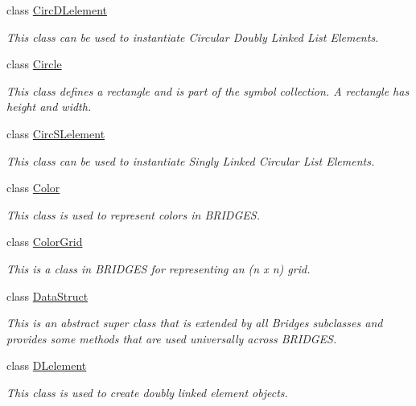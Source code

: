 \begin{DoxyCompactItemize}
class \mbox{\hyperlink{classbridges_1_1base_1_1_circ_d_lelement}{Circ\+D\+Lelement}}
\begin{DoxyCompactList}\small\item\em This class can be used to instantiate Circular Doubly Linked List Elements. \end{DoxyCompactList}\item 
class \mbox{\hyperlink{classbridges_1_1base_1_1_circle}{Circle}}
\begin{DoxyCompactList}\small\item\em This class defines a rectangle and is part of the symbol collection. A rectangle has height and width. \end{DoxyCompactList}\item 
class \mbox{\hyperlink{classbridges_1_1base_1_1_circ_s_lelement}{Circ\+S\+Lelement}}
\begin{DoxyCompactList}\small\item\em This class can be used to instantiate Singly Linked Circular List Elements. \end{DoxyCompactList}\item 
class \mbox{\hyperlink{classbridges_1_1base_1_1_color}{Color}}
\begin{DoxyCompactList}\small\item\em This class is used to represent colors in B\+R\+I\+D\+G\+ES. \end{DoxyCompactList}\item 
class \mbox{\hyperlink{classbridges_1_1base_1_1_color_grid}{Color\+Grid}}
\begin{DoxyCompactList}\small\item\em This is a class in B\+R\+I\+D\+G\+ES for representing an (n x n) grid. \end{DoxyCompactList}\item 
class \mbox{\hyperlink{classbridges_1_1base_1_1_data_struct}{Data\+Struct}}
\begin{DoxyCompactList}\small\item\em This is an abstract super class that is extended by all Bridges subclasses and provides some methods that are used universally across B\+R\+I\+D\+G\+ES. \end{DoxyCompactList}\item 
class \mbox{\hyperlink{classbridges_1_1base_1_1_d_lelement}{D\+Lelement}}
\begin{DoxyCompactList}\small\item\em This class is used to create doubly linked element objects. \end{DoxyCompactList}\item 

\end{DoxyCompactItemize}
